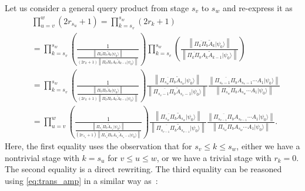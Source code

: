 \documentclass[letterpaper,onecolumn,11pt,accepted=2026-02-14]{quantumarticle}
\newcommand{\norm}[1]{\left\lVert#1\right\rVert}
\theoremstyle{remark}
\theoremstyle{plain}
\newcommand{\eq}[1]{\cref{eq:#1}}
\newcommand{\ket}[1]{|#1\rangle}
\begin{document}
Let us consider a general query product from stage $s_v$ to $s_w$ and re-express it as
\begin{equation}
\label{eq:query_product}
\begin{aligned}
    &\prod_{u=v}^{w}(2r_{s_u}+1)
    =\prod_{k=s_v}^{s_{w}}(2r_k+1)\\
    &=\prod_{k=s_v}^{s_{w}}\left(\frac{1}{\frac{\norm{\overline{\Pi_k\Pi_b}\widetilde A_k\ket{\psi_0}}}{(2r_k+1)\norm{\overline{\Pi_k\Pi_b}A_k\widetilde A_{k-1}\ket{\psi_0}}}}\right)
    \prod_{k=s_v}^{s_{w}}\left(\frac{\norm{\overline{\Pi_k\Pi_b}\widetilde A_k\ket{\psi_0}}}{\norm{\overline{\Pi_k\Pi_b}A_k\widetilde A_{k-1}\ket{\psi_0}}}\right)\\
    &=\prod_{k=s_v}^{s_{w}}\left(\frac{1}{\frac{\norm{\overline{\Pi_k\Pi_b}\widetilde A_k\ket{\psi_0}}}{(2r_k+1)\norm{\overline{\Pi_k\Pi_b}A_k\widetilde A_{k-1}\ket{\psi_0}}}}\right)
    \frac{\norm{\overline{\Pi_{s_{w}}\Pi_b}\widetilde A_{s_{w}}\ket{\psi_0}}}{\norm{\overline{\Pi_{s_v-1}\Pi_b}\widetilde{A}_{s_v-1}\ket{\psi_0}}}
    \frac{\norm{\overline{\Pi_{s_v-1}\Pi_b}A_{s_v-1}\cdots A_1\ket{\psi_0}}}{\norm{\overline{\Pi_{{s_{w}}}\Pi_b}A_{{s_{w}}}\cdots A_1\ket{\psi_0}}}\\
    &=\prod_{u=v}^{w}\left(\frac{1}{\frac{\norm{\overline{\Pi_{s_u}\Pi_b}\widetilde A_{s_u}\ket{\psi_0}}}{(2r_{s_u}+1)\norm{\overline{\Pi_{s_u}\Pi_b}A_{s_u}\widetilde A_{s_u-1}\ket{\psi_0}}}}\right)
    \frac{\norm{\overline{\Pi_{s_{w}}\Pi_b}\widetilde A_{s_{w}}\ket{\psi_0}}}{\norm{\overline{\Pi_{s_{v-1}}\Pi_b}\widetilde{A}_{s_{v-1}}\ket{\psi_0}}}
    \frac{\norm{\overline{\Pi_{s_{v-1}}\Pi_b}A_{s_{v-1}}\cdots A_1\ket{\psi_0}}}{\norm{\overline{\Pi_{s_{w}}\Pi_b}A_{s_{w}}\cdots A_1\ket{\psi_0}}}.
\end{aligned}
\end{equation}
Here, the first equality uses the observation that for $s_v\leq k\leq s_w$, either we have a nontrivial stage with $k=s_u$ for $v\leq u\leq w$, or we have a trivial stage with $r_k=0$. The second equality is a direct rewriting. The third equality can be reasoned using \eq{trans_amp} in a similar way as~\cite[Lemma 16]{Chakraborty2018BlockEncoding}:
\end{document}
